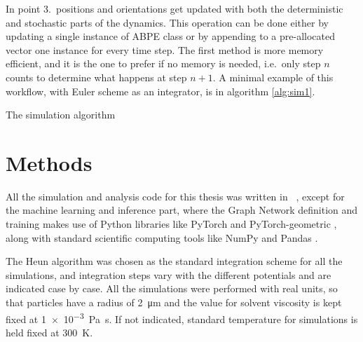 \documentclass[../../master_thesis_np.tex]{subfiles}
\begin{document}
	In point 3.\ positions and orientations get updated with both the deterministic and stochastic parts of the dynamics. 
	This operation can be done either by updating a single instance of ABPE class or by appending to a pre-allocated vector one instance for every time step. 
	The first method is more memory efficient, and it is the one to prefer if no memory is needed, i.e.\ only step $n$ counts to determine what happens at step $n+1$. 
	A minimal example of this workflow, with Euler scheme as an integrator, is in algorithm \ref{alg:sim1}.
	
	\begin{algorithm}
		\caption{The simulation algorithm} \label{alg:sim1}	
		\begin{algorithmic}[1]
			\EndFor
			\EndFor
			\EndFor
		\end{algorithmic}
	\end{algorithm}  
	
	\section{Methods}
	All the simulation and analysis code for this thesis was written in \julia\ \cite{julia}, except for the machine learning and inference part, where the Graph Network definition and training makes use of Python libraries like PyTorch \cite{pytorch} and PyTorch-geometric \cite{pyg}, along with standard scientific computing tools like NumPy \cite{numpy} and Pandas \cite{pandas}.
	
	The Heun algorithm was chosen as the standard integration scheme for all the simulations, and integration steps vary with the different potentials and are indicated case by case. 
	All the simulations were performed with real units, so that particles have a radius of \SI{2}{\um} and the value for solvent viscosity is kept fixed at \SI{1e-3}{\pascal\second}. 
	If not indicated, standard temperature for simulations is held fixed at \SI{300}{\kelvin}.
	
\end{document}

